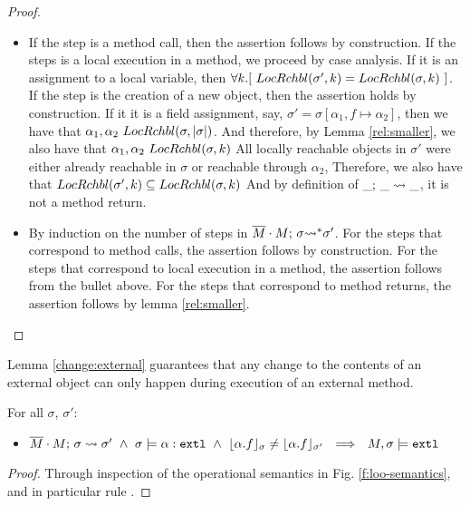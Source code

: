 \begin{proof} $~ $

\begin{itemize}
\item
If the step is a method call, then the assertion follows by construction.
If the steps is a   local execution in a method, we proceed by case analysis. If it is an assignment to a local variable, then 
$\forall k.[\ LocRchbl(\sigma',k)= LocRchbl(\sigma,k)\ ]$.
If the step is the creation of a new object, then the assertion holds by construction.
If it it is a field assignment, say, $\sigma'=\sigma[\alpha_1,f \mapsto \alpha_2]$, then we have that 
$\alpha_1, \alpha_2 \  LocRchbl(\sigma,|\sigma|)$. 
And therefore, by Lemma \ref{rel:smaller}, we also have that $\alpha_1, \alpha_2 \  LocRchbl(\sigma,k)$
All locally reachable objects in $\sigma'$ were either already reachable in $\sigma$ or reachable through $\alpha_2$,
Therefore, we also have that  $LocRchbl(\sigma',k)\subseteq  LocRchbl(\sigma,k)$
 And by definition of $\_;\, {\_} \rightsquigarrow \_$, it is not a method return.
 
\item
By induction on the number of steps in $\overline{M}\cdot M;\, {\sigma} {\rightsquigarrow^*} \sigma'$. 
For the steps that correspond to method calls, the assertion follows by construction.
For the steps that correspond to local execution in a method, the assertion follows from the bullet above.
For the steps that correspond to method returns, the assertion follows by lemma \ref{rel:smaller}.
\end{itemize}
\end{proof}

Lemma \ref{change:external} guarantees that any change to the contents of an external object can only happen during execution of an external method.
 
 {
 \begin{lemma} For all $\sigma$, $\sigma'$:
 \label{change:external}
\begin{itemize}
\item
$\leadstoBounded  {\Mtwo\cdot M}  {\sigma}  {\sigma'}\ \wedge \  \sigma \models \external{\alpha} \ \wedge\  {\interpret{\sigma} {\alpha.f}} \neq {\interpret{\sigma'} {\alpha.f}}
 \ \ \Longrightarrow\ \  M,\sigma \models \extThis$
\end{itemize}
\end{lemma}
  } 
  \begin{proof}
  Through inspection of the operational semantics in Fig. \ref{f:loo-semantics}, and in particular rule {}.
  \end{proof}  
  
